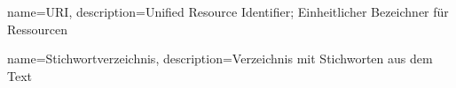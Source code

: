 
{
    name={URI},
    description={Unified Resource Identifier; Einheitlicher Bezeichner für Ressourcen}
}

{
    name={Stichwortverzeichnis},
    description={Verzeichnis mit Stichworten aus dem Text}
}
